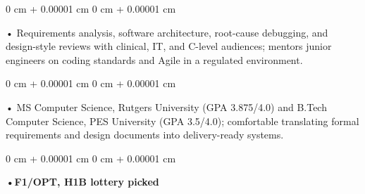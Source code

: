 \documentclass[10pt, letterpaper]{article}
\newenvironment{onecolentry}{
    \begin{adjustwidth}{
        0 cm + 0.00001 cm
    }{
        0 cm + 0.00001 cm
    }
}{
    \end{adjustwidth}
} %
\begin{document}
        \begin{onecolentry}
            • Requirements analysis, software architecture, root-cause debugging, and design-style reviews with clinical, IT, and C-level audiences; mentors junior engineers on coding standards and Agile in a regulated environment.
        \end{onecolentry}
        \begin{onecolentry}
            • MS Computer Science, Rutgers University (GPA 3.875/4.0) and B.Tech Computer Science, PES University (GPA 3.5/4.0); comfortable translating formal requirements and design documents into delivery-ready systems.
        \end{onecolentry}
        \begin{onecolentry}
                \textbf{•F1/OPT, H1B lottery picked}
        \end{onecolentry}

    \vspace{2 pt }
\end{document}
